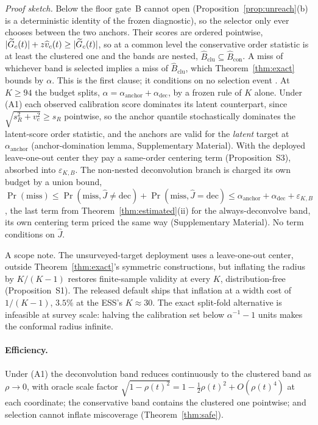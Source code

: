 \emph{Proof sketch.} Below the floor gate~B cannot open
(Proposition~\ref{prop:unreach}(b) is a deterministic identity of the frozen
diagnostic), so the selector only ever chooses between the two anchors. Their scores are ordered pointwise,
$|\widetilde{G}_c(t)|+z\widehat v_c(t)\ge|\widetilde{G}_c(t)|$, so at a common level the
conservative order statistic is at least the clustered one and the bands are
nested, $\widehat B_{\text{clu}}\subseteq\widehat B_{\text{con}}$. A miss of
whichever band is selected implies a miss of $\widehat B_{\text{clu}}$,
which Theorem~\ref{thm:exact} bounds by $\alpha$. This is the first clause;
it conditions on no selection event
\citep{gupta2022nested,yang2024selection}. At $K\ge94$ the budget splits,
$\alpha=\alpha_{\text{anchor}}+\alpha_{\text{dec}}$, by a frozen rule of $K$
alone. Under (A1) each
observed calibration score dominates its latent counterpart, since
$\sqrt{s_R^2+v_c^2}\ge s_R$ pointwise, so the anchor quantile
stochastically dominates the latent-score order statistic, and the anchors
are valid for the \emph{latent} target at $\alpha_{\text{anchor}}$
(anchor-domination lemma, Supplementary Material). With the deployed
leave-one-out center they pay a same-order centering term
(Proposition~S3), absorbed into $\varepsilon_{K,B}$. The non-nested
deconvolution branch is charged its own budget by a union bound,
$\Pr(\text{miss})\le\Pr(\text{miss},\widehat J\ne\text{dec})+
\Pr(\text{miss},\widehat J=\text{dec})\le\alpha_{\text{anchor}}+
\alpha_{\text{dec}}+\varepsilon_{K,B}$, the last term from
Theorem~\ref{thm:estimated}(ii) for the always-deconvolve band, its own
centering term priced the same way (Supplementary Material). No term
conditions on $\widehat J$.

A scope note. The unsurveyed-target deployment uses a leave-one-out center,
outside Theorem~\ref{thm:exact}'s symmetric constructions, but inflating the
radius by $K/(K{-}1)$ restores finite-sample validity at every $K$,
distribution-free (Proposition~S1). The released default ships that
inflation at a width cost of $1/(K{-}1)$, $3.5\%$ at the ESS's
$K\approx30$. The exact split-fold alternative is infeasible at survey scale:
halving the calibration set below $\alpha^{-1}{-}1$ units makes the
conformal radius infinite.

\paragraph{Efficiency.} Under (A1) the deconvolution band reduces
continuously to the clustered band as $\rho\to0$, with oracle scale factor
$\sqrt{1-\rho(t)^2}=1-\tfrac12\rho(t)^2+O(\rho(t)^4)$ at each coordinate;
the conservative band contains the clustered one pointwise; and selection
cannot inflate miscoverage (Theorem~\ref{thm:safe}).
